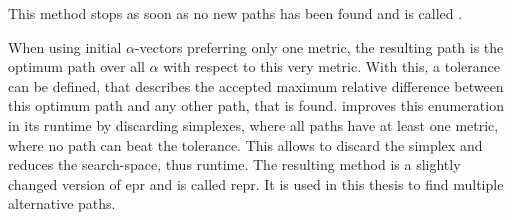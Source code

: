     This method stops as soon as no new paths has been found and is called .

    When using initial $\alpha$-vectors preferring only one metric, the resulting path is the optimum path over all $\alpha$ with respect to this very metric.
    With this, a tolerance can be defined, that describes the accepted maximum relative difference between this optimum path and any other path, that is found.
    \cite{barth:alternative_routes} improves this enumeration in its runtime by discarding simplexes, where all paths have at least one metric, where no path can beat the tolerance.
    This allows to discard the simplex and reduces the search-space, thus runtime.
    The resulting method is a slightly changed version of \gls{epr} and is called \gls{repr}.
    It is used in this thesis to find multiple alternative paths.